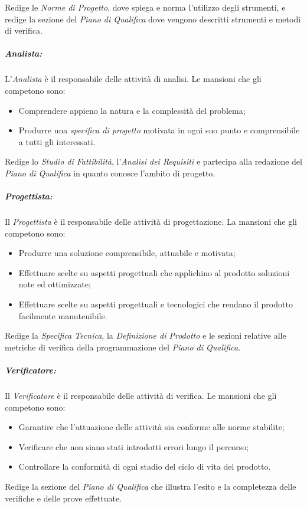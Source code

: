 Redige le \textit{Norme di Progetto}, dove spiega e norma l'utilizzo degli strumenti, e redige la sezione del \textit{Piano di Qualifica} dove vengono descritti strumenti e metodi di verifica.
\subparagraph{Analista:}
L'\textit{Analista} è il responsabile delle attività di analisi. Le mansioni che gli competono sono:
\begin{itemize}
	\item Comprendere appieno la natura e la complessità del problema;
	\item Produrre una \textit{specifica di progetto} motivata in ogni suo punto e comprensibile a tutti gli interessati.
\end{itemize}
Redige lo \textit{Studio di Fattibilità}, l'\textit{Analisi dei Requisiti} e partecipa alla redazione del \textit{Piano di Qualifica} in quanto conosce l'ambito di progetto.

\subparagraph{Progettista:}
Il \textit{Progettista} è il responsabile delle attività di progettazione. La mansioni che gli competono sono:
\begin{itemize}
	\item Produrre una soluzione comprensibile, attuabile e motivata;
	\item Effettuare scelte su aspetti progettuali che applichino al prodotto soluzioni note ed ottimizzate;
	\item Effettuare scelte su aspetti progettuali e tecnologici che rendano il prodotto facilmente manutenibile.
\end{itemize}
Redige la \textit{Specifica Tecnica}, la \textit{Definizione di Prodotto} e le sezioni relative alle metriche di verifica della programmazione del \textit{Piano di Qualifica}.

\subparagraph{Verificatore:}
Il \textit{Verificatore} è il responsabile delle attività di verifica. Le mansioni che gli competono sono:
\begin{itemize}
	\item Garantire che l'attuazione delle attività sia conforme alle norme stabilite;
	\item Verificare che non siano stati introdotti errori lungo il percorso;
	\item Controllare la conformità di ogni stadio del ciclo di vita del prodotto.
\end{itemize}
Redige la sezione del \textit{Piano di Qualifica} che illustra l'esito e la completezza delle verifiche
e delle prove effettuate.

